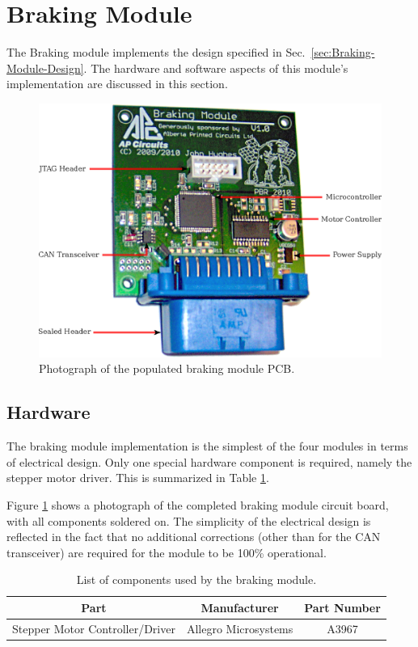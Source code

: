 \section{Braking Module}

The Braking module implements the design specified in Sec.\ \ref{sec:Braking-Module-Design}. The hardware and software aspects of this module's implementation are discussed in this section.

\begin{figure}[h]
\centering
\includegraphics[scale=1]{implementation/figures/braking_pcb}
\caption{Photograph of the populated braking module PCB.}
\label{fig:braking_pcb}
\end{figure}

\subsection{Hardware}

The braking module implementation is the simplest of the four modules in terms of electrical design. Only one special hardware component is required, namely the stepper motor driver. This is summarized in Table \ref{table:braking_module_components}.

Figure \ref{fig:braking_pcb} shows a photograph of the completed braking module circuit board, with all components soldered on. The simplicity of the electrical design is reflected in the fact that no additional corrections (other than for the CAN transceiver) are required for the module to be 100\% operational.

\begin{table}
  \caption{List of components used by the braking module.}
  \centering
  \begin{tabular}{|c|c|c|}
    \hline 
    Part & Manufacturer & Part Number\tabularnewline 
    \hline \hline
    Stepper Motor Controller/Driver & Allegro Microsystems & A3967 \tabularnewline
    \hline
  \end{tabular}
  \label{table:braking_module_components}
\end{table}

